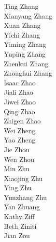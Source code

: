 Ting Zhang\\
Xianyang Zhang\\
Xuan Zhang\\
Yichi Zhang\\
Yiming Zhang\\
Yuping Zhang\\
Zhenkui Zhang\\
Zhonghui Zhang\\
Isaac Zhao\\
Jiali Zhao\\
Jiwei Zhao\\
Qing Zhao\\
Zhigen Zhao\\
Wei Zheng\\
Yao Zheng\\
Jie Zhou\\
Wen Zhou\\
Min Zhu\\
Xiaojing Zhu\\
Ying Zhu\\
Yunzhang Zhu\\
Yan Zhuang\\
Kathy Ziff\\
Beth Ziniti\\
Jian Zou\\
